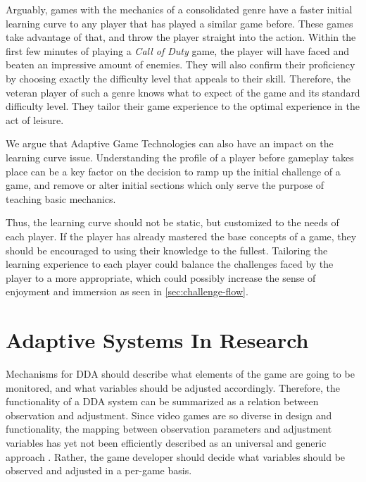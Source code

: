 Arguably, games with the mechanics of a consolidated genre have a faster initial learning curve to any player that has played a similar game before. These games take advantage of that, and throw the player straight into the action. Within the first few minutes of playing a \emph{Call of Duty} game, the player will have faced and beaten an impressive amount of enemies. They will also confirm their proficiency by choosing exactly the difficulty level that appeals to their skill. Therefore, the veteran player of such a genre knows what to expect of the game and its standard difficulty level. They tailor their game experience to the optimal experience in the act of leisure.

We argue that Adaptive Game Technologies can also have an impact on the learning curve issue. Understanding the profile of a player before gameplay takes place can be a key factor on the decision to ramp up the initial challenge of a game, and remove or alter initial sections which only serve the purpose of teaching basic mechanics.

Thus, the learning curve should not be static, but customized to the needs of each player. If the player has already mastered the base concepts of a game, they should be encouraged to using their knowledge to the fullest. Tailoring the learning experience to each player could balance the challenges faced by the player to a more appropriate, which could possibly increase the sense of enjoyment and immersion as seen in \autoref{sec:challenge-flow}.


\section{Adaptive Systems In Research}

Mechanisms for DDA should describe what elements of the game are going to be monitored, and what variables should be adjusted accordingly. Therefore, the functionality of a DDA system can be summarized as a relation between observation and adjustment. Since video games are so diverse in design and functionality, the mapping between observation parameters and adjustment variables has yet not been efficiently described as an universal and generic approach \cite{PHD_DynamicDifficultyAdjustment}. Rather, the game developer should decide what variables should be observed and adjusted in a per-game basis.

